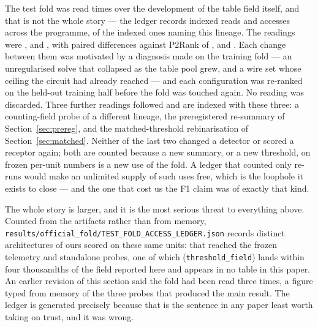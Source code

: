 \documentclass[11pt]{article}
\begin{document}
The test fold was read \NTestReads{} times over the development of the table
field itself, and that is not the whole story --- the ledger records
\NIndexedReads{} indexed reads and \NFoldAccesses{} accesses across the
programme, \NLineageReads{} of the indexed ones naming this lineage. The
readings were \ReadAucI{},
\ReadAucII{} and \TabAuc{}, with paired differences against P2Rank of
\ReadDeltaI{}, \ReadDeltaII{} and \TabAucD{}. Each change between them was
motivated by a diagnosis made on the training fold --- an unregularised solve
that collapsed as the table pool grew, and a wire set whose ceiling the circuit
had already reached --- and each configuration was re-ranked on the held-out
training half before the fold was touched again. No reading was discarded. Three
further readings followed and are indexed with these three: a counting-field
probe of a different lineage, the preregistered re-summary of
Section~\ref{sec:prereg}, and the matched-threshold rebinarisation of
Section~\ref{sec:matched}. Neither of the last two changed a detector or scored a
receptor again; both are counted because a new summary, or a new threshold, on
frozen per-unit numbers is a new use of the fold. A ledger that counted only
re-runs would make an unlimited supply of such uses free, which is the loophole
it exists to close --- and the one that cost us the F1 claim was of exactly that
kind.

The whole story is larger, and it is the most serious threat to everything
above. Counted from the artifacts rather than from memory,
\texttt{results/official\_fold/TEST\_FOLD\_ACCESS\_LEDGER.json} records
\NArchOnFold{} distinct architectures of ours scored on these same \NUnits{}
units: \NOurDetectors{} that reached the frozen telemetry and
\NStandaloneProbes{} standalone probes, one of which (\texttt{threshold\_field})
lands within four thousandths of the field reported here and appears in no table
in this paper. An earlier revision of this section said the fold had been read
three times, a figure typed from memory of the three probes that produced the
main result. The ledger is generated precisely because that is the sentence in
any paper least worth taking on trust, and it was wrong.
\end{document}
